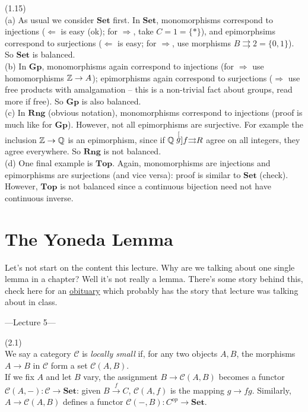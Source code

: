 \documentclass[a4paper]{article}
\begin{document}
\begin{eg} (1.15)\\
    (a) As usual we consider $\mathbf{Set}$ first. In $\mathbf{Set}$, monomorphisms correspond to injections ($\Leftarrow$ is easy (ok); for $\Rightarrow$, take $C = 1 = \{*\}$), and epimorphsims correspond to surjections ($\Leftarrow$ is easy; for $\Rightarrow$, use morphisms $B \rightrightarrows 2 = \{0,1\}$). So $\mathbf{Set}$ is balanced.\\
    (b) In $\mathbf{Gp}$, monomorphisms again correspond to injections (for $\Rightarrow$ use homomorphisms $\mathbb{Z} \to A$); epimorphisms again correspond to surjections ($\Rightarrow$ use free products with amalgamation -- this is a non-trivial fact about groups, read more if free). So $\mathbf{Gp}$ is also balanced.\\
    (c) In $\mathbf{Rng}$ (obvious notation), monomorphisms correspond to injections (proof is much like for $\mathbf{Gp}$). However, not all epimorphisms are surjective. For example the inclusion $\mathbb{Z} \to \mathbb{Q}$ is an epimorphism, since if $\mathbb{Q} \stackrel[g]{f}{\rightrightarrows} R$ agree on all integers, they agree everywhere. So $\mathbf{Rng}$ is not balanced.\\
    (d) One final example is $\mathbf{Top}$. Again, monomorphisms are injections and epimorphisms are surjections (and vice versa): proof is similar to $\mathbf{Set}$ (check). However, $\mathbf{Top}$ is not balanced since a continuous bijection need not have continuous inverse.
\end{eg}

\newpage

\section{The Yoneda Lemma}
Let's not start on the content this lecture. Why are we talking about one single lemma in a chapter? Well it's not really a lemma. There's some story behind this, check here for an \href{https://www.mta.ca/~cat-dist/catlist/1999/yoneda}{obituary} which probably has the story that lecture was talking about in class.

---Lecture 5---
\begin{defi} (2.1)\\
    We say a category $\mathcal{C}$ is \emph{locally small} if, for any two objects $A,B$, the morphisms $A\to B$ in $\mathcal{C}$ form a set $\mathcal{C}(A,B)$.\\
    If we fix $A$ and let $B$ vary, the assignment $B \to \mathcal{C}(A,B)$ becomes a functor $\mathcal{C}(A,-):\mathcal{C} \to \mathbf{Set}$: given $B \xrightarrow{f} C$, $\mathcal{C}(A,f)$ is the mapping $g \to fg$. Similarly, $A \to \mathcal{C}(A,B)$ defines a functor $\mathcal{C}(-,B):C^{op} \to \mathbf{Set}$.
\end{defi}
\end{document}
